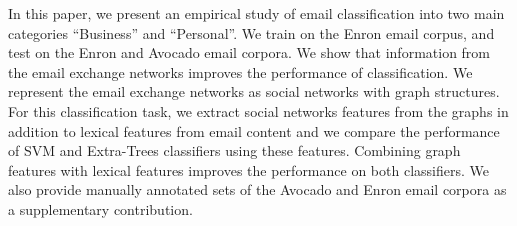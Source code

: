 In this paper, we present an empirical study of email classification into two main categories ``Business'' and ``Personal''.  We train on the Enron email corpus, and test on the Enron and Avocado email corpora. We show that information from the email exchange networks improves the performance of classification. We represent the email exchange networks as social networks with graph structures. For this classification task, we extract social networks features from the graphs in addition to lexical features from email content and we compare the performance of SVM and Extra-Trees classifiers using these features.  Combining graph features with lexical features improves the performance on both classifiers. We also provide manually annotated sets of the Avocado and Enron email corpora as a supplementary contribution.

